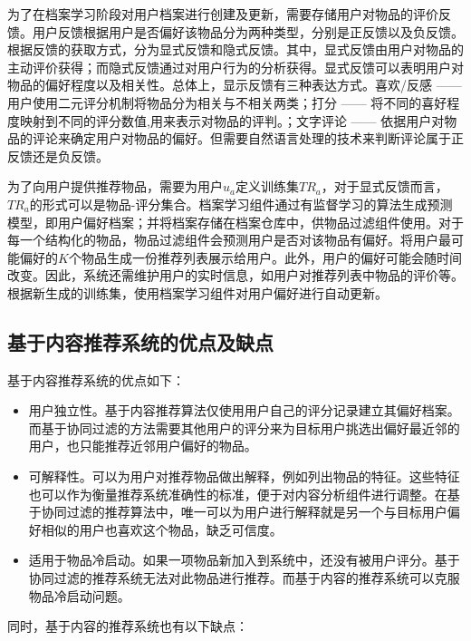 为了在档案学习阶段对用户档案进行创建及更新，需要存储用户对物品的评价反馈\parencite{goldberg1992using}。用户反馈根据用户是否偏好该物品分为两种类型，分别是正反馈以及负反馈\parencite{holte1996inferring}。根据反馈的获取方式，分为显式反馈和隐式反馈。其中，显式反馈由用户对物品的主动评价获得；而隐式反馈通过对用户行为的分析获得。显式反馈可以表明用户对物品的偏好程度以及相关性。总体上，显示反馈有三种表达方式。喜欢/反感 —— 用户使用二元评分机制将物品分为相关与不相关两类\parencite{billsus1999hybrid}；打分 —— 将不同的喜好程度映射到不同的评分数值,用来表示对物品的评判\parencite{pazzani1996syskill}。；文字评论 —— 依据用户对物品的评论来确定用户对物品的偏好\parencite{resnick1994grouplens}。但需要自然语言处理的技术来判断评论属于正反馈还是负反馈。

为了向用户提供推荐物品，需要为用户$u_a$定义训练集$TR_a$，对于显式反馈而言，$TR_a$的形式可以是物品-评分集合。档案学习组件通过有监督学习的算法生成预测模型，即用户偏好档案；并将档案存储在档案仓库中，供物品过滤组件使用。对于每一个结构化的物品，物品过滤组件会预测用户是否对该物品有偏好。将用户最可能偏好的$K$个物品生成一份推荐列表展示给用户。此外，用户的偏好可能会随时间改变。因此，系统还需维护用户的实时信息，如用户对推荐列表中物品的评价等。根据新生成的训练集，使用档案学习组件对用户偏好进行自动更新。

\subsection{基于内容推荐系统的优点及缺点}

基于内容推荐系统的优点如下：

\begin{itemize}
 \item 用户独立性。基于内容推荐算法仅使用用户自己的评分记录建立其偏好档案。而基于协同过滤的方法需要其他用户的评分来为目标用户挑选出偏好最近邻的用户，也只能推荐近邻用户偏好的物品。
 \item 可解释性。可以为用户对推荐物品做出解释，例如列出物品的特征。这些特征也可以作为衡量推荐系统准确性的标准，便于对内容分析组件进行调整。在基于协同过滤的推荐算法中，唯一可以为用户进行解释就是另一个与目标用户偏好相似的用户也喜欢这个物品，缺乏可信度。
 \item 适用于物品冷启动。如果一项物品新加入到系统中，还没有被用户评分。基于协同过滤的推荐系统无法对此物品进行推荐。而基于内容的推荐系统可以克服物品冷启动问题。
\end{itemize}

同时，基于内容的推荐系统也有以下缺点：

